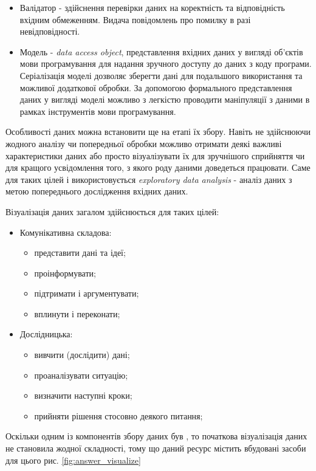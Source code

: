 \begin{itemize}
\begin{itemize}
		\item Валідатор - здійснення перевірки даних на коректність та відповідність вхідним обмеженням. Видача повідомлень про помилку в разі невідповідності.
		\item Модель - \textit{data access object}, представлення вхідних даних у вигляді об'єктів мови програмування для надання зручного доступу до даних з коду програми. Серіалізація моделі дозволяє зберегти дані для подальшого використання та можливої додаткової обробки. За допомогою формального представлення даних у вигляді моделі можливо з легкістю проводити маніпуляції з даними в рамках інструментів мови програмування.
	\end{itemize}
\end{itemize}

Особливості даних можна встановити ще на етапі їх збору. Навіть не здійснюючи жодного аналізу чи попередньої обробки можливо отримати деякі важливі характеристики даних або просто візуалізувати їх для зручнішого сприйняття чи для кращого усвідомлення того, з якого роду даними доведеться працювати. Саме для таких цілей і використовується \textit{exploratory data analysis} - аналіз даних з метою попереднього дослідження вхідних даних.

Візуалізація даних загалом здійснюється для таких цілей:
\begin{itemize}  
	\item Комунікативна складова:
	\begin{itemize}
		\item представити дані та ідеї;
		\item проінформувати;
		\item підтримати і аргументувати;
		\item вплинути і переконати;
	\end{itemize}
	\item Дослідницька:
	\begin{itemize}
		\item вивчити (дослідити) дані;
		\item проаналізувати ситуацію;
		\item визначити наступні кроки;
		\item прийняти рішення стосовно деякого питання;
	\end{itemize}
\end{itemize}

Оскільки одним із компонентів збору даних був , то початкова візуалізація даних не становила жодної складності, тому що даний ресурс містить вбудовані засоби для цього рис. \ref{fig:answer_visualize} 

